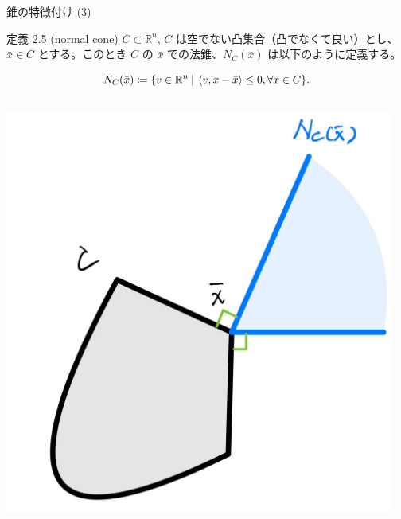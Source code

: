 \documentclass[aspectratio=169, dvipdfmx, 11pt]{beamer} %
\begin{document}
\begin{frame}{錐の特徴付け (3)}
  \begin{block}{定義 2.5 (normal cone) }
    $C \subset \mathbb{R}^n$, $C$ は空でない凸集合（凸でなくて良い）とし、$\bar{x} \in C$ とする。このとき $C$ の $\bar{x}$ での法錐、$N_C(\bar{x})$ は以下のように定義する。

    \begin{equation}
      N_C(\bar{x}) \coloneqq \{ v \in \mathbb{R}^n \:|\: \left\langle v, x - \bar{x} \right\rangle \leq 0, \forall x \in C \}. \notag
    \end{equation}

  \end{block}

  \centering
  \begin{columns}
    \begin{column}{0.48\textwidth}
      \includegraphics[keepaspectratio, scale=0.06]{figures/normal_cone_1.jpg}
    \end{column}
    \begin{column}{0.48\textwidth}

\end{column}
\end{columns}
\end{frame}
\end{document}
